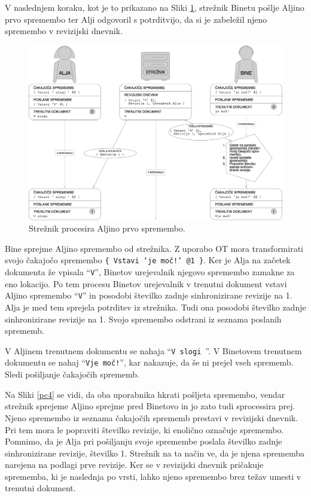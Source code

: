 \documentclass[a4paper, 12pt, twoside]{book}
\begin{document}
\pagebreak

V naslednjem koraku, kot je to prikazano na Sliki \ref{pc3}, strežnik Binetu pošlje Aljino prvo spremembo ter Alji odgovoril s potrditvijo, da si je zabeležil njeno spremembo v revizijski dnevnik.

\begin{figure}[placement h]
\begin{center}
\includegraphics[width=14cm]{pc3.png}
\end{center}
\caption{Strežnik procesira Aljino prvo spremembo.}
\label{pc3}
\end{figure}

Bine sprejme Aljino spremembo od strežnika. Z uporabo OT mora transformirati svojo čakajočo spremembo {\tt \{ Vstavi ‘je moč!’ @1 \}}. Ker je Alja na začetek dokumenta že vpisala “{\tt V}”, Binetov urejevalnik njegovo spremembo zamakne za eno lokacijo. Po tem procesu Binetov urejevalnik v trenutni dokument vstavi Aljino spremembo “{\tt V}” in posodobi številko zadnje sinhronizirane revizije na 1. Alja je med tem sprejela potrditev iz strežnika. Tudi ona posodobi številko zadnje sinhronizirane revizije na 1. Svojo spremembo odstrani iz seznama poslanih sprememb.

V Aljinem trenutnem dokumentu se nahaja “{\tt V slogi }”. V Binetovem trenutnem dokumentu se nahaj “{\tt Vje moč!}”, kar nakazuje, da še ni prejel vseh sprememb. Sledi pošiljanje čakajočih sprememb.

\pagebreak

Na Sliki \ref{pc4} se vidi, da oba uporabnika hkrati pošljeta spremembo, vendar strežnik sprejeme Aljino sprejme pred Binetovo in jo zato tudi sprocessira prej. Njeno spremembo iz seznama čakajočih sprememb prestavi v revizijski dnevnik. Pri tem mora le popraviti številko revizije, ki enolično označuje spremembo. Pomnimo, da je Alja pri pošiljanju svoje spremembe poslala številko zadnje sinhronizirane revizije, številko 1. Strežnik na ta način ve, da je njena sprememba narejena na podlagi prve revizije. Ker se v revizijski dnevnik pričakuje sprememba, ki je naslednja po vrsti, lahko njeno spremembo brez težav umesti v trenutni dokument.
\end{document}
